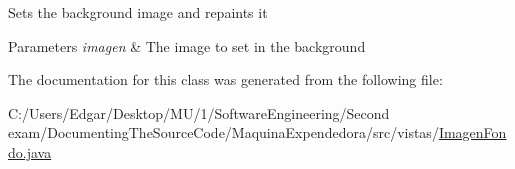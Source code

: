 Sets the background image and repaints it 
\begin{DoxyParams}{Parameters}
{\em imagen} & The image to set in the background \\
\hline
\end{DoxyParams}


The documentation for this class was generated from the following file\+:\begin{DoxyCompactItemize}
\item 
C\+:/\+Users/\+Edgar/\+Desktop/\+M\+U/1/\+Software\+Engineering/\+Second exam/\+Documenting\+The\+Source\+Code/\+Maquina\+Expendedora/src/vistas/\mbox{\hyperlink{_imagen_fondo_8java}{Imagen\+Fondo.\+java}}\end{DoxyCompactItemize}
